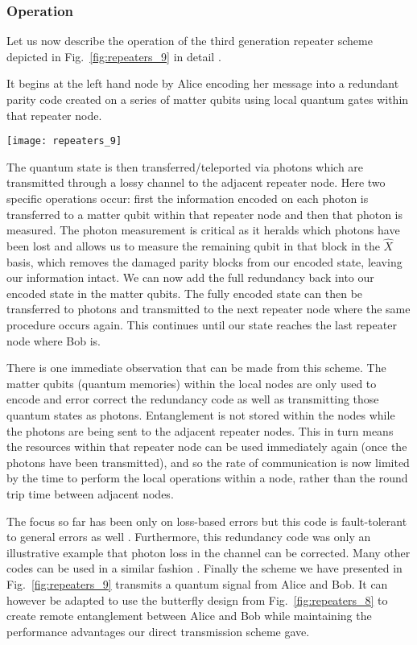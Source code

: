 \subsubsection{Operation}

Let us now describe the operation of the third generation repeater scheme  depicted in Fig.~\ref{fig:repeaters_9} in detail \cite{bib:munro12, bib:MKLLJ14}.

It begins at the left hand node by Alice encoding her message into a redundant parity code created on a series of matter qubits using local quantum gates within that repeater node.

\begin{figure*}[!htb]
\texttt{[image: repeaters\_9]}
\caption{Transmission of a quantum signal using loss based error correction codes in a quantum network.}
\label{fig:repeaters_9}
\end{figure*}

The quantum state is then transferred/teleported via photons which are transmitted through a lossy channel to the adjacent repeater node. Here two specific operations occur: first the information encoded on each photon is transferred to a matter qubit within that repeater node and then that photon is measured. The photon measurement is critical as it heralds which photons have been lost and allows us to measure the remaining qubit in that block in the $\hat{X}$ basis, which removes the damaged parity blocks from our encoded state, leaving our information intact. We can now add the full redundancy back into our encoded state in the matter qubits. The fully encoded state can then be transferred to photons and transmitted to the next repeater node where the same procedure occurs again. This continues until our state reaches the last repeater node where Bob is.

There is one immediate observation that can be made from this scheme. The matter qubits (quantum memories) within the local nodes are only used to encode and error correct the redundancy code as well as transmitting those quantum states as photons. Entanglement is not stored within the nodes while the photons are being sent to the adjacent repeater nodes. This in turn means the resources within that repeater node can be used immediately again (once the photons have been transmitted), and so the rate of communication is now limited by the time to perform the local operations within a node, rather than the round trip time between adjacent nodes. 

The focus so far has been only on loss-based errors but this code is fault-tolerant to general errors as well \cite{bib:MKLLJ14}. Furthermore, this redundancy code was only an illustrative example that photon loss in the channel can be corrected. Many other codes can be used in a similar fashion \cite{bib:munro12, bib:Fowler10, bib:MKLLJ14}. Finally the scheme we have presented in Fig.~\ref{fig:repeaters_9} transmits a quantum signal from Alice and Bob. It can however be adapted to use the butterfly design from Fig.~\ref{fig:repeaters_8} to create remote entanglement between Alice and Bob while maintaining the performance advantages our direct transmission scheme gave. 

